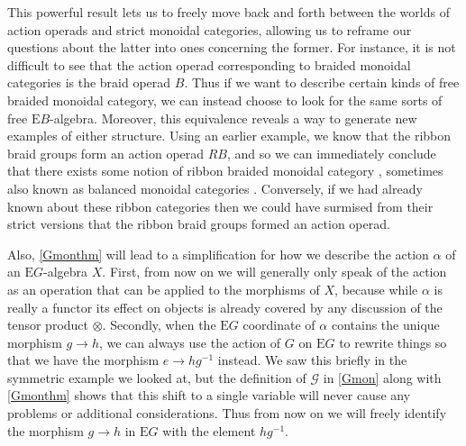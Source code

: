 This powerful result lets us to freely move back and forth between the worlds of action operads and strict monoidal categories, allowing us to reframe our questions about the latter into ones concerning the former. For instance, it is not difficult to see that the action operad corresponding to braided monoidal categories is the braid operad $B$. Thus if we want to describe certain kinds of free braided monoidal category, we can instead choose to look for the same sorts of free $\mathrm{E}B$-algebra. Moreover, this equivalence reveals a way to generate new examples of either structure. Using an earlier example, we know that the ribbon braid groups form an action operad $RB$, and so we can immediately conclude that there exists some notion of ribbon braided monoidal category \cite{ribbon1}, sometimes also known as balanced monoidal categories \cite{graphicalmon}. Conversely, if we had already known about these ribbon categories then we could have surmised from their strict versions that the ribbon braid groups formed an action operad.

Also, \cref{Gmonthm} will lead to a simplification for how we describe the action $\alpha$ of an $\mathrm{E}G$-algebra $X$. First, from now on we will generally only speak of the action as an operation that can be applied to the morphisms of $X$, because while $\alpha$ is really a functor its effect on objects is already covered by any discussion of the tensor product $\otimes$. Secondly, when the $\mathrm{E}G$ coordinate of $\alpha$ contains the unique morphism $g \to h$, we can always use the action of $G$ on $\mathrm{E}G$ to rewrite things so that we have the morphism $e \to hg^{-1}$ instead. We saw this briefly in the symmetric example we looked at, but the definition of $\mathcal{G}$ in \cref{Gmon} along with \cref{Gmonthm} shows that this shift to a single variable will never cause any problems or additional considerations. Thus from now on we will freely identify the morphism $g \to h$ in $\mathrm{E}G$ with the element $hg^{-1}$.